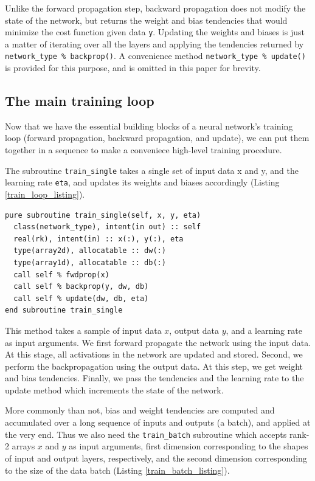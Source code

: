 \documentclass[sigplan, review=false, screen=true, balance=true]{acmart}
\begin{document}
Unlike the forward propagation step, backward propagation does not modify
the state of the network, but returns the weight and bias tendencies that
would minimize the cost function given data \lstinline{y}. Updating the weights
and biases is just a matter of iterating over all the layers and applying the
tendencies returned by \lstinline{network_type % backprop()}. A convenience
method \lstinline{network_type % update()} is provided for this purpose, and
is omitted in this paper for brevity.

\subsection{The main training loop}

Now that we have the essential building blocks of a neural network's training
loop (forward propagation, backward propagation, and update), we can put them
together in a sequence to make a conveniece high-level training procedure.

The subroutine \lstinline{train_single} takes a single set of input data x and y,
and the learning rate \lstinline{eta}, and updates its weights and biases
accordingly (Listing \ref{train_loop_listing}).

\begin{lstlisting}[caption={A training procedure for a single data sample.}, captionpos=b, label={train_loop_listing}]
pure subroutine train_single(self, x, y, eta)
  class(network_type), intent(in out) :: self
  real(rk), intent(in) :: x(:), y(:), eta
  type(array2d), allocatable :: dw(:)
  type(array1d), allocatable :: db(:)
  call self % fwdprop(x)
  call self % backprop(y, dw, db)
  call self % update(dw, db, eta)
end subroutine train_single
\end{lstlisting}

This method takes a sample of input data $x$, output data $y$, and a learning
rate as input arguments. We first forward propagate the network using the input
data. At this stage, all activations in the network are updated and stored.
Second, we perform the backpropagation using the output data. At this step,
we get weight and bias tendencies. Finally, we pass the tendencies and the
learning rate to the update method which increments the state of the network.

More commonly than not, bias and weight tendencies are computed and accumulated
over a long sequence of inputs and outputs (a batch), and applied
at the very end. Thus we also need the \lstinline{train_batch} subroutine
which accepts rank-2 arrays $x$ and $y$ as input arguments, first dimension
corresponding to the shapes of input and output layers, respectively, and the
second dimension corresponding to the size of the data batch
(Listing \ref{train_batch_listing}).
\end{document}
